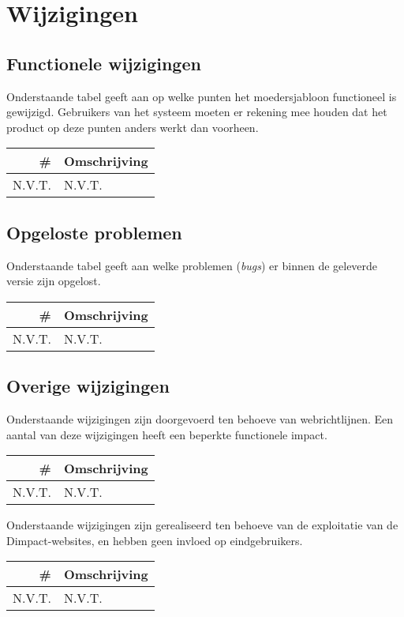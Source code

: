 \documentclass[12pt]{article}
\begin{document}
\section{Wijzigingen}
\subsection{Functionele wijzigingen}
Onderstaande tabel geeft aan op welke punten het moedersjabloon functioneel is gewijzigd. Gebruikers van het systeem moeten er rekening mee houden dat het product op deze punten anders werkt dan voorheen.

\begin{tabular}{| r | p{15cm} |}
	\hline \# & Omschrijving \\ \hline
	N.V.T. & N.V.T. \\ \hline
\end{tabular}

\subsection{Opgeloste problemen}
Onderstaande tabel geeft aan welke problemen (\emph{bugs}) er binnen de geleverde versie zijn opgelost.

\begin{tabular}{| r | p{15cm} |}
	\hline \# & Omschrijving \\ \hline
	N.V.T. & N.V.T. \\ \hline
\end{tabular}

\subsection{Overige wijzigingen}

Onderstaande wijzigingen zijn doorgevoerd ten behoeve van webrichtlijnen. Een aantal van deze wijzigingen heeft een beperkte functionele impact.

\begin{tabular}{| r | p{15cm} |}
	\hline \# & Omschrijving \\ \hline
	N.V.T. & N.V.T. \\ \hline
\end{tabular}

Onderstaande wijzigingen zijn gerealiseerd ten behoeve van de exploitatie van de Dimpact-websites, en hebben geen invloed op eindgebruikers.

\begin{tabular}{| r | p{15cm} |}
	\hline \# & Omschrijving \\ \hline
	N.V.T. & N.V.T. \\ \hline
\end{tabular}
\end{document}
